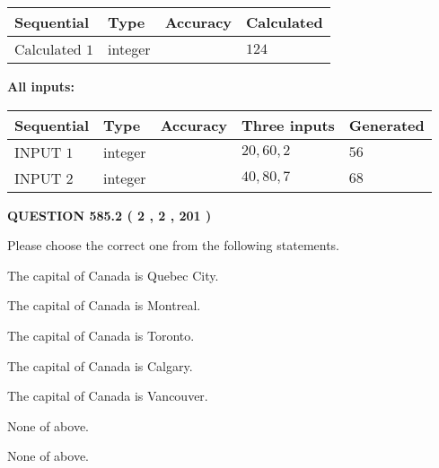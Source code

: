 \documentclass[12pt]{article}
\begin{document}
   
  
  
\noindent\begin{tabular}{|l|l|l|l|}
\hline
 Sequential & Type & Accuracy & Calculated \\ 
\hline
 
 
  Calculated $  1 $ & integer &  & 
  $ 124 $ 
 \\  \hline  
 \end{tabular}
   
   
   
   
\noindent\vspace{0.1in}\hspace{-0.08in} {\textbf{\Large{All inputs: }}}
   
   
  
  
\noindent\begin{tabular}{|l|l|l|l|l|}
\hline
 Sequential & Type & Accuracy & Three inputs & Generated \\ 
\hline
 
 
  INPUT $  1 $ & integer &  & $
 20
 , 
 60
 , 
 2
 $ & $ 56 $ 
 \\  \hline  
 
 
  INPUT $  2 $ & integer &  & $
 40
 , 
 80
 , 
 7
 $ & $ 68 $ 
 \\  \hline  
 \end{tabular}
   
   
  
\vspace{0.2in}
  
{\textbf{\Large{QUESTION
585.2 
 ( 2 , 2 , 201 )
}}}
  
  
Please choose the correct one from the following statements.
 
 
The capital of Canada is Quebec City.
 
 
The capital of Canada is Montreal.
 
 
The capital of Canada is Toronto.
 
 
The capital of Canada is Calgary.
 
 
The capital of Canada is Vancouver.
 
 
 None of above.
 
 
\noindent{}
 
 
 None of above.
 
\end{document}
